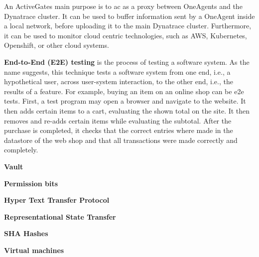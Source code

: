 An ActiveGates\cite{activegates} main purpose is to ac as a proxy between OneAgents and the Dynatrace cluster.
It can be used to buffer information sent by a OneAgent inside a local network, before uploading it to the main Dynatrace cluster.
Furthermore, it can be used to monitor cloud centric technologies, such as AWS, Kubernetes, Openshift, or other cloud systems.

\textbf{End-to-End (E2E) testing}\cite{end-to-end-integration-testing-design} is the process of testing a software system.
As the name suggests, this technique tests a software system from one end, i.e., a hypothetical user, across user-system interaction, to the other end, i.e., the results of a feature.
For example, buying an item on an online shop can be e2e tests.
First, a test program may open a browser and navigate to the website.
It then adds certain items to a cart, evaluating the shown total on the site.
It then removes and re-adds certain items while evaluating the subtotal.
After the purchase is completed, it checks that the correct entries where made in the datastore of the web shop and that all transactions were made correctly and completely.

\textbf{Vault}\cite{vault}

\textbf{Permission bits}

\textbf{Hyper Text Transfer Protocol}

\textbf{Representational State Transfer}

\textbf{SHA Hashes}

\textbf{Virtual machines}

